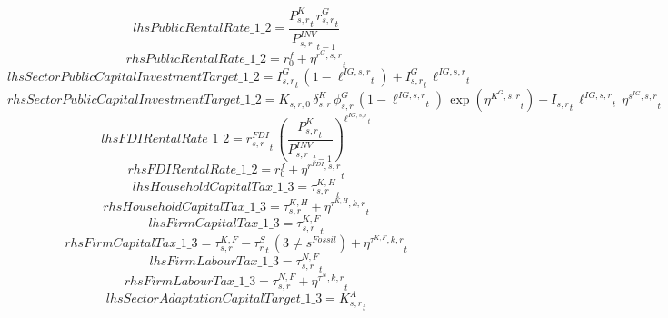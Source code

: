 \begin{dmath*}
lhsPublicRentalRate\_1\_2 = \frac{{{P^K_{s,r}}}_{t}\, {{r^G_{s,r}}}_{t}}{{{P^{INV}_{s,r}}}_{t-1}}
\end{dmath*}
\begin{dmath*}
rhsPublicRentalRate\_1\_2 = {{r^f_0}}+{{\eta^{r^G,s,r}}}_{t}
\end{dmath*}
\begin{dmath*}
lhsSectorPublicCapitalInvestmentTarget\_1\_2 = {{I^G_{s,r}}}_{t}\, \left(1-{{\ell^{IG,s,r}}}_{t}\right)+{{I^G_{s,r}}}_{t}\, {{\ell^{IG,s,r}}}_{t}
\end{dmath*}
\begin{dmath*}
rhsSectorPublicCapitalInvestmentTarget\_1\_2 = {{K_{s,r,0}}}\, {{\delta^{K}_{s,r}}}\, {{\phi^{G}_{s,r}}}\, \left(1-{{\ell^{IG,s,r}}}_{t}\right)\, \exp\left({{\eta^{K^G,s,r}}}_{t}\right)+{{I_{s,r}}}_{t}\, {{\ell^{IG,s,r}}}_{t}\, {{\eta^{s^{IG},s,r}}}_{t}
\end{dmath*}
\begin{dmath*}
lhsFDIRentalRate\_1\_2 = {{r^{FDI}_{s,r}}}_{t}\, \left(\frac{{{P^K_{s,r}}}_{t}}{{{P^{INV}_{s,r}}}_{t-1}}\right)^{{{\ell^{IG,s,r}}}_{t}}
\end{dmath*}
\begin{dmath*}
rhsFDIRentalRate\_1\_2 = {{r^f_0}}+{{\eta^{r^{FDI},s,r}}}_{t}
\end{dmath*}
\begin{dmath*}
lhsHouseholdCapitalTax\_1\_3 = {{\tau^{K,H}_{s,r}}}_{t}
\end{dmath*}
\begin{dmath*}
rhsHouseholdCapitalTax\_1\_3 = {{\tau^{K,H}_{s,r}}}+{{\eta^{\tau^{K,H},k,r}}}_{t}
\end{dmath*}
\begin{dmath*}
lhsFirmCapitalTax\_1\_3 = {{\tau^{K,F}_{s,r}}}_{t}
\end{dmath*}
\begin{dmath*}
rhsFirmCapitalTax\_1\_3 = {{\tau^{K,F}_{s,r}}}-{{\tau^{S}_{r}}}_{t}\, \left(3\neq {{s^{Fossil}}}\right)+{{\eta^{\tau^{K,F},k,r}}}_{t}
\end{dmath*}
\begin{dmath*}
lhsFirmLabourTax\_1\_3 = {{\tau^{N,F}_{s,r}}}_{t}
\end{dmath*}
\begin{dmath*}
rhsFirmLabourTax\_1\_3 = {{\tau^{N,F}_{s,r}}}+{{\eta^{\tau^{N},k,r}}}_{t}
\end{dmath*}
\begin{dmath*}
lhsSectorAdaptationCapitalTarget\_1\_3 = {{K^{A}_{s,r}}}_{t}
\end{dmath*}
